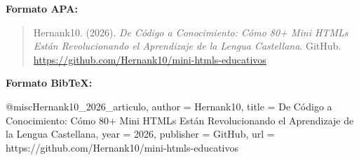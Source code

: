 \documentclass[12pt,spanish]{article}
\begin{document}
\textbf{Formato APA:}

\begin{quote}
Hernank10. (2026). \textit{De Código a Conocimiento: Cómo 80+ Mini HTMLs Están Revolucionando el Aprendizaje de la Lengua Castellana}. GitHub. \url{https://github.com/Hernank10/mini-htmls-educativos}
\end{quote}

\textbf{Formato BibTeX:}

\begin{codigo}
@misc{Hernank10_2026_articulo,
  author = {Hernank10},
  title = {De Código a Conocimiento: Cómo 80+ Mini HTMLs Están Revolucionando el Aprendizaje de la Lengua Castellana},
  year = {2026},
  publisher = {GitHub},
  url = {https://github.com/Hernank10/mini-htmls-educativos}
}
\end{codigo}
\end{document}

